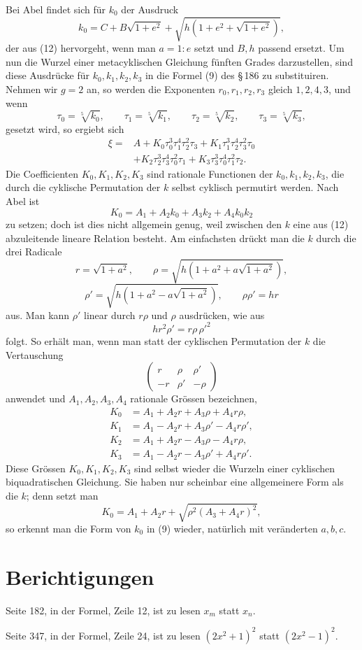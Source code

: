 \documentclass[11pt]{article}
\begin{document}
Bei Abel findet sich f\"ur $k_0$ der Ausdruck
\[
  k_0=C+B\sqrt{1+e^2}+\sqrt{h(1+e^2+\sqrt{1+e^2})},
\]
der aus (12) hervorgeht, wenn man $a=1:e$ setzt und $B,h$ passend ersetzt. Um nun die Wurzel einer metacyklischen Gleichung f\"unften Grades darzustellen, sind diese Ausdr\"ucke f\"ur $k_0,k_1,k_2,k_3$ in die Formel (9) des \S\,186 zu substituiren. Nehmen wir $g=2$ an, so werden die Exponenten $r_0,r_1,r_2,r_3$ gleich $1,2,4,3$, und wenn
\[
  \tau_0=\sqrt[5]{k_0},\qquad \tau_1=\sqrt[5]{k_1},\qquad
  \tau_2=\sqrt[5]{k_2},\qquad \tau_3=\sqrt[5]{k_3},
\]
gesetzt wird, so ergiebt sich
\begin{equation}\tag{13}
\begin{aligned}
 \xi={}&A+K_0\tau_0^3\tau_1^4\tau_2^2\tau_3
      +K_1\tau_1^3\tau_2^4\tau_3^2\tau_0\\
     &+K_2\tau_2^3\tau_3^4\tau_0^2\tau_1
      +K_3\tau_3^3\tau_0^4\tau_1^2\tau_2.
\end{aligned}
\end{equation}
Die Coefficienten $K_0,K_1,K_2,K_3$ sind rationale Functionen der $k_0,k_1,k_2,k_3$, die durch die cyklische Permutation der $k$ selbst cyklisch permutirt werden. Nach Abel ist
\[
  K_0=A_1+A_2k_0+A_3k_2+A_4k_0k_2
\]
zu setzen; doch ist dies nicht allgemein genug, weil zwischen den $k$ eine aus (12) abzuleitende lineare Relation besteht. Am einfachsten dr\"uckt man die $k$ durch die drei Radicale
\[
  r=\sqrt{1+a^2},\qquad
  \rho=\sqrt{h(1+a^2+a\sqrt{1+a^2})},
\]
\[
  \rho'=\sqrt{h(1+a^2-a\sqrt{1+a^2})},\qquad \rho\rho'=hr
\]
aus. Man kann $\rho'$ linear durch $r\rho$ und $\rho$ ausdr\"ucken, wie aus
\[
  hr^2\rho'=r\rho\,\rho'^2
\]
folgt. So erh\"alt man, wenn man statt der cyklischen Permutation der $k$ die Vertauschung
\[
  \begin{pmatrix} r&\rho&\rho'\\ -r&\rho'&-\rho\end{pmatrix}
\]
anwendet und $A_1,A_2,A_3,A_4$ rationale Gr\"ossen bezeichnen,
\begin{equation}\tag{14}
\begin{aligned}
 K_0&=A_1+A_2r+A_3\rho+A_4r\rho,\\
 K_1&=A_1-A_2r+A_3\rho'-A_4r\rho',\\
 K_2&=A_1+A_2r-A_3\rho-A_4r\rho,\\
 K_3&=A_1-A_2r-A_3\rho'+A_4r\rho'.
\end{aligned}
\end{equation}
Diese Gr\"ossen $K_0,K_1,K_2,K_3$ sind selbst wieder die Wurzeln einer cyklischen biquadratischen Gleichung. Sie haben nur scheinbar eine allgemeinere Form als die $k$; denn setzt man
\[
  K_0=A_1+A_2r+\sqrt{\rho^2(A_3+A_4r)^2},
\]
so erkennt man die Form von $k_0$ in (9) wieder, nat\"urlich mit ver\"anderten $a,b,c$.

\section*{Berichtigungen}

Seite 182, in der Formel, Zeile 12, ist zu lesen $x_m$ statt $x_n$.

Seite 347, in der Formel, Zeile 24, ist zu lesen $(2x^2+1)^2$ statt $(2x^2-1)^2$.
\end{document}
